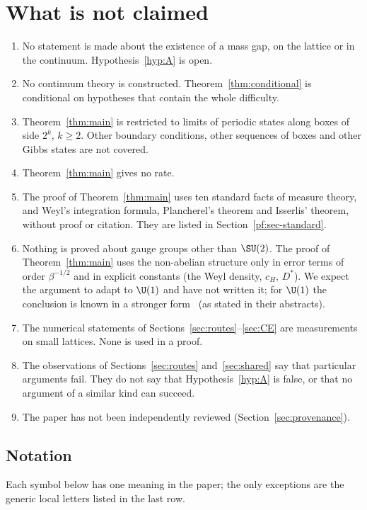 \section{What is not claimed}\label{sec:notclaimed}

\begin{enumerate}
\item No statement is made about the existence of a mass gap, on the lattice or in the continuum. Hypothesis~\ref{hyp:A} is open.
\item No continuum theory is constructed. Theorem~\ref{thm:conditional} is conditional on hypotheses that contain the whole difficulty.
\item Theorem~\ref{thm:main} is restricted to limits of periodic states along boxes of side $2^k$, $k\ge2$. Other boundary conditions, other sequences of boxes and other Gibbs states are not covered.
\item Theorem~\ref{thm:main} gives no rate.
\item The proof of Theorem~\ref{thm:main} uses ten standard facts of measure theory, and Weyl's integration formula, Plancherel's theorem and Isserlis' theorem, without proof or citation. They are listed in Section~\ref{pf:sec-standard}.
\item Nothing is proved about gauge groups other than $\SU(2)$. The proof of Theorem~\ref{thm:main} uses the non-abelian structure only in error terms of order $\beta^{-1/2}$ and in explicit constants (the Weyl density, $c_H$, $D^*$). We expect the argument to adapt to $\U(1)$ and have not written it; for $\U(1)$ the conclusion is known in a stronger form~\cite{Guth80,FS82} (as stated in their abstracts).
\item The numerical statements of Sections~\ref{sec:routes}--\ref{sec:CE} are measurements on small lattices. None is used in a proof.
\item The observations of Sections~\ref{sec:routes} and~\ref{sec:shared} say that particular arguments fail. They do not say that Hypothesis~\ref{hyp:A} is false, or that no argument of a similar kind can succeed.
\item The paper has not been independently reviewed (Section~\ref{sec:provenance}).
\end{enumerate}

\subsection*{Notation}
Each symbol below has one meaning in the paper; the only exceptions are the generic local letters listed in the last row.

